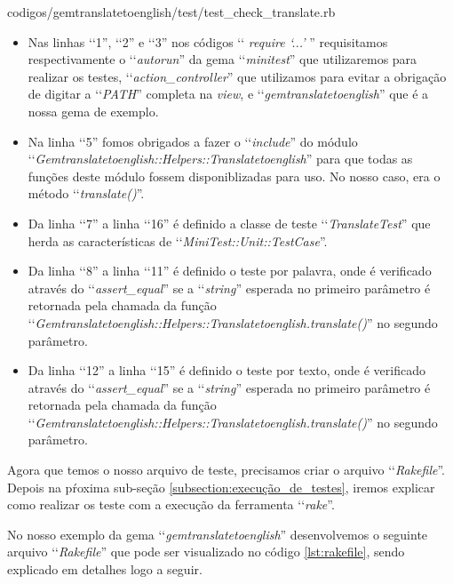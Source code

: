 
{codigos/gemtranslatetoenglish/test/test_check_translate.rb}

\begin{itemize}

 \item Nas linhas ‘‘1'', ‘‘2'' e ‘‘3'' nos códigos ‘‘ \emph{require ‘...'} '' requisitamos respectivamente o
 ‘‘\emph{autorun}'' da gema ‘‘\emph{minitest}'' que utilizaremos para realizar os testes,
 ‘‘\emph{action\_controller}'' que utilizamos para evitar a obrigação de digitar a ‘‘\emph{PATH}'' completa
 na \emph{view}, e ‘‘\emph{gemtranslatetoenglish}'' que é a nossa gema de exemplo.

 \item Na linha ‘‘5'' fomos obrigados a fazer o ‘‘\emph{include}'' do módulo
 ‘‘\emph{Gemtranslatetoenglish::Helpers::Translatetoenglish}'' para que todas as funções deste módulo fossem
 disponiblizadas para uso. No nosso caso, era o método ‘‘\emph{translate()}''.

 \item Da linha ‘‘7'' a linha ‘‘16'' é definido a classe de teste ‘‘\emph{TranslateTest}'' que herda as
 características de ‘‘\emph{MiniTest::Unit::TestCase}''.

 \item Da linha ‘‘8'' a linha ‘‘11'' é definido o teste por palavra, onde é verificado através do
 ‘‘\emph{assert\_equal}'' se a ‘‘\emph{string}'' esperada no primeiro parâmetro é retornada pela chamada
 da função ‘‘\emph{Gemtranslatetoenglish::Helpers::Translatetoenglish.translate()}'' no segundo parâmetro.

 \item Da linha ‘‘12'' a linha ‘‘15'' é definido o teste por texto, onde é verificado através do
 ‘‘\emph{assert\_equal}'' se a ‘‘\emph{string}'' esperada no primeiro parâmetro é retornada pela chamada
 da função ‘‘\emph{Gemtranslatetoenglish::Helpers::Translatetoenglish.translate()}'' no segundo parâmetro.

\end{itemize}

Agora que temos o nosso arquivo de teste, precisamos criar o arquivo ‘‘\emph{Rakefile}''. Depois na pŕoxima
sub-seção \ref{subsection:execução_de_testes}, iremos explicar como realizar os teste com a execução da
ferramenta ‘‘\emph{rake}''.

No nosso exemplo da gema ‘‘\emph{gemtranslatetoenglish}'' desenvolvemos o seguinte arquivo
‘‘\emph{Rakefile}'' que pode ser visualizado no código \ref{lst:rakefile}, sendo explicado em detalhes
logo a seguir.

